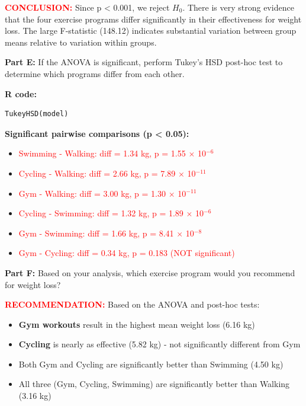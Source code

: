 \documentclass[11pt]{article}
\begin{document}
\textcolor{red}{\textbf{CONCLUSION:}} Since p < 0.001, we reject $H_0$. There is very strong evidence that the four exercise programs differ significantly in their effectiveness for weight loss. The large F-statistic (148.12) indicates substantial variation between group means relative to variation within groups.

\vspace{0.5cm}

\textbf{Part E:} If the ANOVA is significant, perform Tukey's HSD post-hoc test to determine which programs differ from each other.

\textbf{R code:}
\begin{lstlisting}
TukeyHSD(model)
\end{lstlisting}

\textbf{Significant pairwise comparisons (p < 0.05):}
\begin{itemize}
\item \textcolor{red}{Swimming - Walking: diff = 1.34 kg, p = 1.55 $\times$ 10$^{-6}$}
\item \textcolor{red}{Cycling - Walking: diff = 2.66 kg, p = 7.89 $\times$ 10$^{-11}$}
\item \textcolor{red}{Gym - Walking: diff = 3.00 kg, p = 1.30 $\times$ 10$^{-11}$}
\item \textcolor{red}{Cycling - Swimming: diff = 1.32 kg, p = 1.89 $\times$ 10$^{-6}$}
\item \textcolor{red}{Gym - Swimming: diff = 1.66 kg, p = 8.41 $\times$ 10$^{-8}$}
\item \textcolor{red}{Gym - Cycling: diff = 0.34 kg, p = 0.183 (NOT significant)}
\end{itemize}

\vspace{0.3cm}

\textbf{Part F:} Based on your analysis, which exercise program would you recommend for weight loss?

\textcolor{red}{\textbf{RECOMMENDATION:}} Based on the ANOVA and post-hoc tests:

\begin{itemize}
\item \textbf{Gym workouts} result in the highest mean weight loss (6.16 kg)
\item \textbf{Cycling} is nearly as effective (5.82 kg) - not significantly different from Gym
\item Both Gym and Cycling are significantly better than Swimming (4.50 kg)
\item All three (Gym, Cycling, Swimming) are significantly better than Walking (3.16 kg)
\end{itemize}
\end{document}
